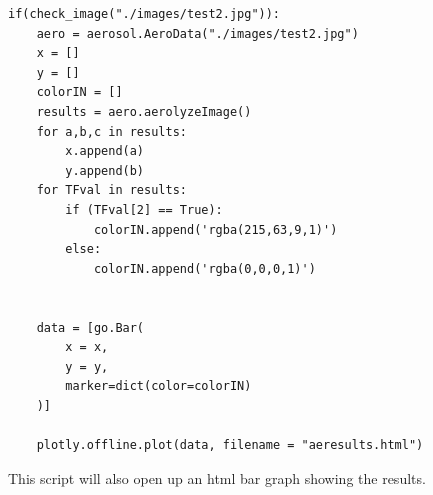\documentclass[onecolumn, draftclsnofoot,10pt, compsoc]{IEEEtran}
\begin{document}
\begin{singlespace}
\begin{lstlisting}
if(check_image("./images/test2.jpg")):
	aero = aerosol.AeroData("./images/test2.jpg")
	x = []
	y = []
	colorIN = []
	results = aero.aerolyzeImage()
	for a,b,c in results:
		x.append(a)
		y.append(b)
	for TFval in results:
		if (TFval[2] == True):
			colorIN.append('rgba(215,63,9,1)')
		else:
			colorIN.append('rgba(0,0,0,1)')


	data = [go.Bar(
		x = x,
		y = y,
		marker=dict(color=colorIN)
	)]

	plotly.offline.plot(data, filename = "aeresults.html")

		\end{lstlisting}
		This script will also open up an html bar graph showing the results.
\end{singlespace}
\clearpage


\end{document}
